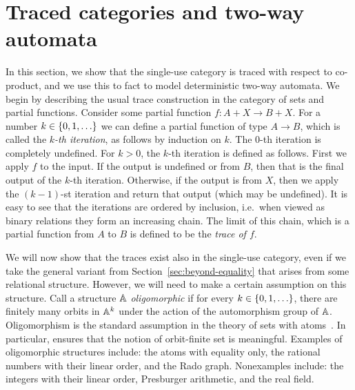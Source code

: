 \section{Traced categories and two-way automata}
\label{sec:two-way-automata}

In this section, we show that the single-use category is traced with respect to co-product, and we use this to fact to model deterministic two-way automata.
We begin by describing the usual trace construction in the category of sets and partial functions. 
Consider some partial function $
f : A + X \to B + X.$
For a number $k \in \{0,1,\ldots\}$ we can define a partial function of type $A \to B$, which is called the \emph{$k$-th iteration}, as  follows by induction on $k$. The $0$-th iteration is  completely undefined. For $k > 0$, the $k$-th iteration is defined as follows. First we apply $f$ to the input. If the output is undefined or from  $B$, then that is the final output of the $k$-th iteration. Otherwise, if the output is from $X$, then we apply the $(k-1)$-st iteration and return that output (which may be undefined). It is easy to see that the iterations are ordered by inclusion, i.e.~when viewed as binary relations they form an increasing chain. The limit of this chain, which is a partial function from $A$ to $B$ is defined to be the \emph{trace of $f$}. 

We will now show that the traces exist also in the single-use category, even if we take the general variant from Section~\ref{sec:beyond-equality} that arises from some relational structure. However, we will need to make a certain assumption on this structure. Call a structure $\mathbb A$  \emph{oligomorphic} if for every $k \in \{0,1,\ldots\}$, there  are finitely many orbits in $\mathbb A^k$ under the action of the automorphism group of $\mathbb A$.
Oligomorphism is the standard assumption in the theory of sets with atoms~\cite{bojanczyk_slightly2018}. In particular, ensures that the notion of orbit-finite set is meaningful. Examples of oligomorphic structures include: the atoms with equality only, the rational numbers with their linear order, and the Rado graph. Nonexamples include: the integers with their linear order, Presburger arithmetic, and the real field. 



